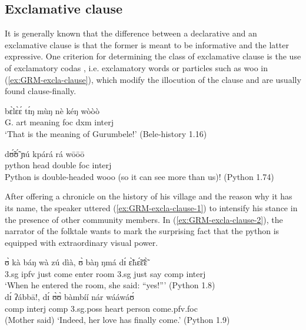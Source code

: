 \subsection{Exclamative clause}
\label{sec:GRM-excla-clause}

It is generally known that the difference between a declarative and an exclamative  clause is 
that the former is meant to be informative and the latter expressive. One criterion for determining 
the class of exclamative clause is the use of  exclamatory codas  \citep[242]{alla14}, i.e.  
exclamatory words or particles such as  {\sls woo} in (\ref{ex:GRM-excla-clause}), which modify the 
illocution of the clause and are usually found clause-finally.

 \ea\label{ex:GRM-excla-clause}
\ea\label{ex:GRM-excla-clause-1}
\gll  bɛ̀lɛ̀ɛ́ tɪ́ŋ mùŋ nè kéŋ wòòò \\
G. {\sc art} meaning {\sc foc} {\sc dxm}  {\sc interj}\\
\glt `‎‎That is the meaning of Gurumbele!' (Bele-history 1.16)

\ex\label{ex:GRM-excla-clause-2}
\gll dʊ̃́ʊ̃́ ɲú kpárá rá wōōō\\
python head double {\sc foc} {\sc interj}\\
\glt Python is double-headed wooo (so it can see more 
than us)!  (Python 1.74)

\z
\z


After offering a chronicle on the history of his village and the reason why it has its name, the 
speaker 
uttered (\ref{ex:GRM-excla-clause-1}) to intensify his stance in the presence of other community 
members. In  (\ref{ex:GRM-excla-clause-2}), the narrator of the folktale wants to mark the 
surprising fact that the python is equipped with extraordinary visual power.



\ea\label{ex:GRM-excla-clause-3-4}
\ea\label{ex:GRM-excla-clause-3}
\gll  ʊ̀ kà báŋ wà zú dìà, ʊ̀ bàŋ ŋmá dɪ́  ɛ̃̀hɛ̃́ɛ̃̄ɛ̃̀\\
{\sc 3.sg} {\sc ipfv} just come enter room  {\sc 3.sg} just say {\sc comp}  {\sc interj}  \\
\glt `When he entered  the room,  she said: ``yes!''' (Python 1.8)\\

\ex\label{ex:GRM-excla-clause-4}
\gll dɪ́ ʔábbā!, dɪ́  ʊ̀ʊ̀ bàmbíí nár wááwáʊ́\\
{\sc comp}  {\sc interj} {\sc comp}  {\sc 3.sg.poss} heart person come.{\sc pfv.foc}\\
\glt (Mother said) `Indeed,   her love has finally come.'  (Python 1.9)\\

